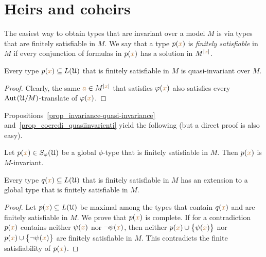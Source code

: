 \documentclass[creche.tex]{subfiles}
\begin{document}
\section{Heirs and coheirs}
\label{coheirs}

The easiest way to obtain types that are invariant over a model $M$ is via types that are finitely satisfiable in $M$.
We say that a type $p({\color{brown} x})$ is  \emph{finitely satisfiable\/} in $M$ if every conjunction of formulas in $p({\color{brown} x})$ has a solution in $M^{|{\color{brown} x}|}$.


\begin{proposition}\label{prop_coeredi_quasiinvarienti}
Every type $p({\color{brown} x})\subseteq L(\EuScript U)$ that is finitely satisfiable in $M$ is quasi-invariant over $M$.
\end{proposition}

\begin{proof}
Clearly, the same ${\color{brown} a}\in M^{|{\color{brown} x}|}$ that satisfies $\varphi({\color{brown} x})$ also satisfies every ${\rm Aut\kern.15ex}(\EuScript U/M)$-translate of $\varphi({\color{brown} x})$.
\end{proof}

Propositions~\ref{prop_invariance-quasi-invariance} and~\ref{prop_coeredi_quasiinvarienti} yield the following (but a direct proof is also easy).

\begin{proposition}\label{prop_coeredi_invarienti}
Let $p({\color{brown} x})\in S_{\varphi}(\EuScript U)$ be a global $\phi$-type that is finitely satisfiable in $M$.
Then $p({\color{brown} x})$ is $M$-in\-vari\-ant.\QED
\end{proposition}

\begin{proposition}\label{prop_exisntence_coheirs}
Every type $q({\color{brown} x})\subseteq L(\EuScript U)$ that is finitely satisfiable in $M$ has an extension to a global type that is finitely satisfiable in $M$.
\end{proposition}

\begin{proof} 
Let $p({\color{brown} x})\subseteq L(\EuScript U)$ be maximal among the types that contain $q({\color{brown} x})$ and are finitely satisfiable in $M$.
We prove that $p({\color{brown} x})$ is complete.
If for a contradiction $p({\color{brown} x})$ contains neither $\psi({\color{brown} x})$ nor $\neg\psi({\color{brown} x})$, then  neither $p({\color{brown} x})\cup\big\{\psi({\color{brown} x})\big\}$ nor $p({\color{brown} x})\cup\big\{\neg\psi({\color{brown} x})\big\}$ are finitely satisfiable in $M$.
This contradicts the finite satisfiability of $p({\color{brown} x})$.
\end{proof}
\end{document}
